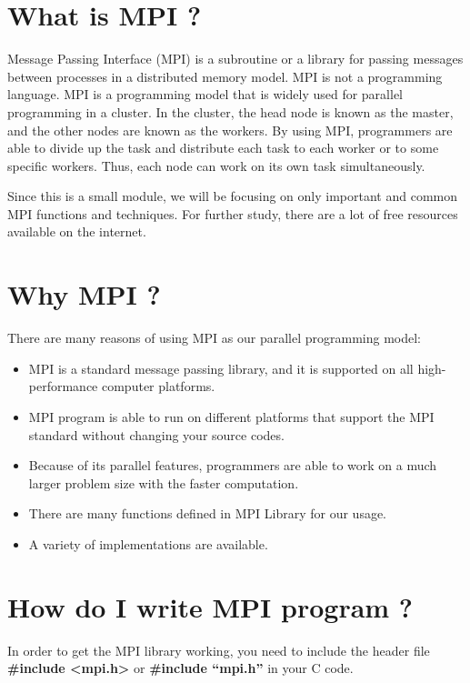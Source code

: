 \documentclass[letterpaper,10pt,openany,oneside]{sphinxmanual}
\begin{document}
\section{What is MPI ?}
\label{introMPI/introMPI:what-is-mpi}
Message Passing Interface (MPI) is a subroutine or a library for passing messages between processes in a distributed memory model. MPI is not a programming language. MPI is a programming model that is widely used for parallel programming in a cluster. In the cluster, the head node is known as the master, and the other nodes are known as the workers. By using MPI, programmers are able to divide up the task and distribute each task to each worker or to some specific workers. Thus, each node can work on its own task simultaneously.

Since this is a small module, we will be focusing on only important and common MPI functions and techniques. For further study, there are a lot of free resources available on the internet.


\section{Why MPI ?}
\label{introMPI/introMPI:why-mpi}
There are many reasons of using MPI as our parallel programming model:
\begin{itemize}
\item {} 
MPI is a standard message passing library, and it is supported on all high-performance computer platforms.

\item {} 
MPI program is able to run on different platforms that support the MPI standard without changing your source codes.

\item {} 
Because of its parallel features, programmers are able to work on a much larger problem size with the faster computation.

\item {} 
There are many functions defined in MPI Library for our usage.

\item {} 
A variety of implementations are available.

\end{itemize}


\section{How do I write MPI program ?}
\label{introMPI/introMPI:how-do-i-write-mpi-program}
In order to get the MPI library working, you need to include the header file \textbf{\#include \textless{}mpi.h\textgreater{}} or \textbf{\#include “mpi.h”} in your C code.
\end{document}
